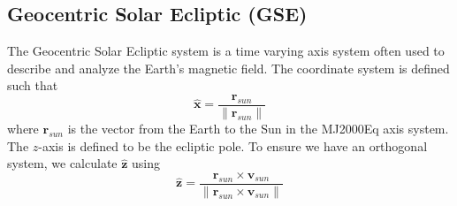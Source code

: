 {%
\subsection{Geocentric Solar
Ecliptic (GSE)  }

The Geocentric Solar Ecliptic system is a time varying axis system
often used to describe and analyze the Earth's magnetic field. The
coordinate system is defined such that
%
\begin{equation}
     \hat{\mathbf{x}} = \frac{\mathbf{r}_{sun}}{\| \mathbf{r}_{sun} \|}
\end{equation}
%
where $\mathbf{r}_{sun}$ is the vector from the Earth to the Sun
in the MJ2000Eq axis system.   The $z$-axis is defined to be the
ecliptic pole. To ensure we have an orthogonal system, we
calculate $\hat{\mathbf{z}}$ using
%
\begin{equation}
     \hat{\mathbf{z}} = \frac{\mathbf{r}_{sun} \times \mathbf{v}_{sun}}{ \|  \mathbf{r}_{sun} \times \mathbf{v}_{sun}   \|}
\end{equation}


}
